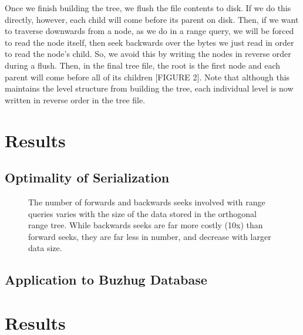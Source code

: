 \documentclass[11pt, oneside]{article}
\begin{document}
Once we finish building the tree, we flush the file contents to disk. If we do
this directly, however, each child will come before its parent on disk. Then,
if we want to traverse downwards from a node, as we do in a range query, we
will be forced to read the node itself, then seek backwards over the bytes we
just read in order to read the node's child. So, we avoid this by writing the
nodes in reverse order during a flush. Then, in the final tree file, the root
is the first node and each parent will come before all of its children [FIGURE
2]. Note that although this maintains the level structure from building the
tree, each individual level is now written in reverse order in the tree file.


\section{Results}

\subsection{Optimality of Serialization}



\begin{figure}[b!]
\centering
{}%
\caption{The number of forwards and backwards seeks involved with range queries varies with the size of the data stored in the orthogonal range tree. While backwards seeks are far more costly (10x) than forward seeks, they are far less in number, and decrease with larger data size.}
\label{fig:figure2}
\end{figure}
\subsection{Application to Buzhug Database}



\section{Results}
\end{document}
